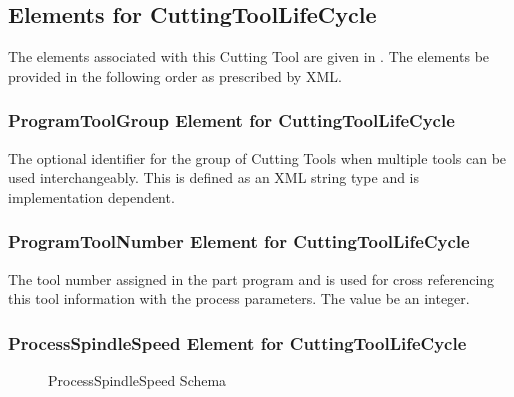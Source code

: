 \FloatBarrier

\subsection{Elements for CuttingToolLifeCycle}

The elements associated with this Cutting Tool are given in . The elements \MUST be provided in the following order as prescribed by XML.



\subsubsection{ProgramToolGroup Element for CuttingToolLifeCycle}

The optional identifier for the group of Cutting Tools when multiple tools can be used interchangeably. This is defined as an XML string type and is implementation dependent. 

\subsubsection{ProgramToolNumber Element for CuttingToolLifeCycle}

The tool number assigned in the part program and is used for cross referencing this tool information with the process parameters. The value \MUST be an integer.

\pagebreak 

\subsubsection{ProcessSpindleSpeed Element for CuttingToolLifeCycle}

\begin{figure}[ht]
  \centering
  \caption{ProcessSpindleSpeed Schema}
  \label{fig:processspindlespeed-schema}
\end{figure}

